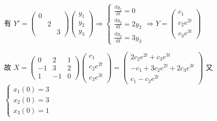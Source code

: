 \begin{enumerate}
			       有 \( Y' = \begin{pmatrix}
				       0 &   &   \\
				         & 2 &   \\
				         &   & 3
			       \end{pmatrix} \begin{pmatrix}
				       y_{1} \\
				       y_{2} \\
				       y_{3}
			       \end{pmatrix} \Rightarrow \begin{cases}
				       \frac{\mathrm{d}y_{1}}{\mathrm{d}t} = 0      \\
				       \frac{\mathrm{d}y_{2}}{\mathrm{d}t} = 2y_{2} \\
				       \frac{\mathrm{d}y_{3}}{\mathrm{d}t} = 3y_{3}
			       \end{cases} \Rightarrow Y = \begin{pmatrix}
				       c_{1}       \\
				       c_{2}e^{2t} \\
				       c_{3}e^{3t}
			       \end{pmatrix} \)

			       故 \( X = \begin{pmatrix}
				       0  & 2  & 1 \\
				       -1 & 3  & 2 \\
				       1  & -1 & 0
			       \end{pmatrix}\begin{pmatrix}
				       c_{1}       \\
				       c_{2}e^{2t} \\
				       c_{3}e^{3t}
			       \end{pmatrix} = \begin{pmatrix}
				       2c_{2}e^{2t} + c_{3}e^{3t}           \\
				       -c_{1} + 3c_{2}e^{2t} + 2c_{3}e^{3t} \\
				       c_{1} - c_{2}e^{2t}
			       \end{pmatrix} \) 又 \( \begin{cases}
				       x_{1}(0) = 3 \\
				       x_{2}(0) = 3 \\
				       x_{3}(0) = 1
			       \end{cases} \)


\end{enumerate}
